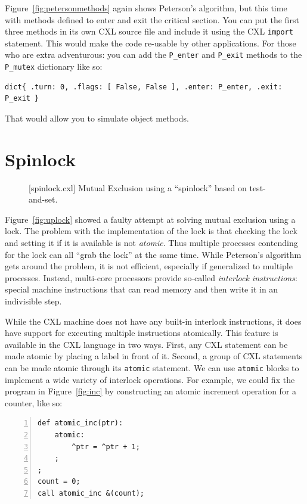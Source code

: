 \documentclass{report}
\newenvironment{code}{
\tcolorbox
}{
\endtcolorbox
}
\begin{document}
Figure~\ref{fig:petersonmethods} again shows Peterson's algorithm,
but this time with methods defined to enter and exit the critical
section.
You can put the first three methods in its own CXL source file
and include it using the CXL \texttt{import} statement.  This would
make the code re-usable by other applications.  For those who are
extra adventurous: you can add the \texttt{P\_enter} and
\texttt{P\_exit} methods to the \texttt{P\_mutex} dictionary
like so:
\begin{code}
\begin{verbatim}
dict{ .turn: 0, .flags: [ False, False ], .enter: P_enter, .exit: P_exit }
\end{verbatim}
\end{code}
That would allow you to simulate object methods.

\chapter{Spinlock}

\begin{figure}
\begin{code}
\end{code}
\caption{[spinlock.cxl] Mutual Exclusion using a ``spinlock'' based on test-and-set.}
\label{fig:tas}
\end{figure}

Figure~\ref{fig:uplock} showed a faulty attempt at solving mutual
exclusion using a lock.  The problem with the implementation of the
lock is that checking the lock and setting it if it is available is
not \emph{atomic}.  Thus multiple processes contending for the lock
can all ``grab the lock'' at the same time.  While Peterson's
algorithm gets around the problem, it is not efficient, especially
if generalized to multiple processes.  Instead, multi-core processors provide
so-called \emph{interlock instructions}: special machine instructions
that can read memory and then write it in an indivisible step.

While the CXL machine does not have any built-in interlock instructions,
it does have support for executing multiple instructions atomically.
This feature is available in the CXL language in two ways.
First, any CXL statement can be made atomic by placing a label in front
of it.  Second, a group of CXL statements can be made atomic
through its \texttt{atomic}
statement.
We can use \texttt{atomic} blocks to implement a wide variety of
interlock operations.
For example, we could fix the program in Figure~\ref{fig:inc} by
constructing an atomic increment operation for a counter, like so:
\begin{code}
\begin{Verbatim}[xleftmargin=5mm,numbers=left]
def atomic_inc(ptr):
    atomic:
        ^ptr = ^ptr + 1;
    ;
;
count = 0;
call atomic_inc &(count);
\end{Verbatim}
\end{code}
\end{document}
